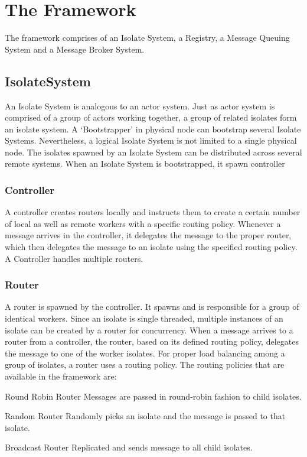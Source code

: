 \section{The Framework}
The framework comprises of an Isolate System, a Registry, a Message Queuing System and a Message Broker System.
  \subsection{IsolateSystem}
  An Isolate System is analogous to an actor system. Just as actor system is comprised of a group of actors working together, a group of related isolates form an isolate system. A ‘Bootstrapper’ in physical node can bootstrap several Isolate Systems. Nevertheless, a logical Isolate System is not limited to a single physical node. The isolates spawned by an Isolate System can be distributed across several remote systems.
  When an Isolate System is bootstrapped, it spawn controller

  \subsubsection{Controller}
  A controller creates routers locally and instructs them to create a certain number of local as well as remote workers with a specific routing policy. Whenever a message arrives in the controller, it delegates the message to the proper router, which then delegates the message to an isolate using the specified routing policy. A Controller handles multiple routers.

  \subsubsection{Router}
  A router is spawned by the controller. It spawns and is responsible for a group of identical workers. Since an isolate is single threaded, multiple instances of an isolate can be created by a router for concurrency. When a message arrives to a router from a controller, the router, based on its defined routing policy, delegates the message to one of the worker isolates.
  For proper load balancing among a group of isolates, a router uses a routing policy. The routing policies that are available in the framework are:

  \begin{description}
    \item{Round Robin Router} Messages are passed in round-robin fashion to child isolates.

    \item{Random Router} Randomly picks an isolate and the message is passed to that isolate.

    \item{Broadcast Router} Replicated and sends message to all child isolates.
  \end{description}

